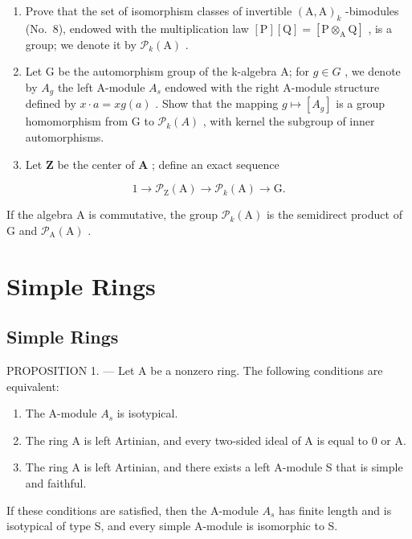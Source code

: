\begin{enumerate}
\def\labelenumi{\alph{enumi})}
\item
  Prove that the set of isomorphism classes of invertible \((\mathrm{A},\mathrm{A})_k\) -bimodules (No.~8), endowed with the multiplication law \([\mathrm{P}][\mathrm{Q}] = [\mathrm{P}\otimes_{\mathrm{A}}\mathrm{Q}]\) , is a group; we denote it by \(\mathcal{P}_k(\mathrm{A})\) .
\item
  Let G be the automorphism group of the k-algebra A; for \(g \in G\) , we denote by \(A_{g}\) the left A-module \(A_{s}\) endowed with the right A-module structure defined by \(x \cdot a = x g(a)\) . Show that the mapping \(g \mapsto [A_{g}]\) is a group homomorphism from G to \(\mathcal{P}_{k}(A)\) , with kernel the subgroup of inner automorphisms.
\item
  Let \(\mathbf{Z}\) be the center of \(\mathbf{A}\) ; define an exact sequence
\end{enumerate}

\[
1 \to \mathcal {P} _ {\mathrm{Z}} (\mathrm{A}) \to \mathcal {P} _ {k} (\mathrm{A}) \to \mathrm{G}.
\]

If the algebra A is commutative, the group \(\mathcal{P}_{k}(\mathrm{A})\) is the semidirect product of G and \(\mathcal{P}_{\mathrm{A}}(\mathrm{A})\) .

\section{Simple Rings}

\subsection{Simple Rings}

PROPOSITION 1. --- Let A be a nonzero ring. The following conditions are equivalent:

\begin{enumerate}
\def\labelenumi{(\roman{enumi})}
\item
  The A-module \(A_{s}\) is isotypical.
\item
  The ring A is left Artinian, and every two-sided ideal of A is equal to 0 or A.
\item
  The ring A is left Artinian, and there exists a left A-module S that is simple and faithful.
\end{enumerate}

If these conditions are satisfied, then the A-module \(A_{s}\) has finite length and is isotypical of type S, and every simple A-module is isomorphic to S.

